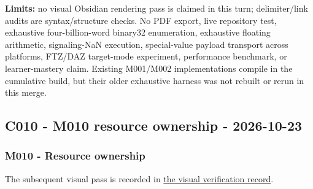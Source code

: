 \textbf{Limits:} no visual Obsidian rendering pass is claimed in this turn; delimiter/link audits are syntax/structure checks. No PDF export, live repository test, exhaustive four-billion-word binary32 enumeration, exhaustive floating arithmetic, signaling-NaN execution, special-value payload transport across platforms, FTZ/DAZ target-mode experiment, performance benchmark, or learner-mastery claim. Existing M001/M002 implementations compile in the cumulative build, but their older exhaustive harness was not rebuilt or rerun in this merge.

\subsection{C010 - M010 resource ownership - 2026-10-23}\label{appendix-a103e7846d21-c010---m010-resource-ownership---2026-10-23}

\subsubsection{M010 - Resource ownership}\label{appendix-a103e7846d21-m010---resource-ownership}

The subsequent visual pass is recorded in \hyperref[appendix-a103e7846d21-visual-revision---2026-10-23]{the visual verification record}.

